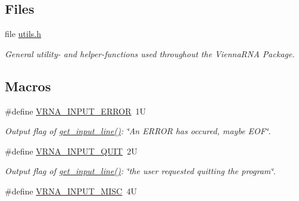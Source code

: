 \subsection*{Files}
\begin{DoxyCompactItemize}
\item 
file \hyperlink{utils_8h}{utils.\-h}
\begin{DoxyCompactList}\small\item\em General utility-\/ and helper-\/functions used throughout the {\itshape Vienna\-R\-N\-A} {\itshape Package}. \end{DoxyCompactList}\end{DoxyCompactItemize}
\subsection*{Macros}
\begin{DoxyCompactItemize}
\item 
\hypertarget{group__utils_gad403c9ea58f1836689404c2931419c8c}{\#define \hyperlink{group__utils_gad403c9ea58f1836689404c2931419c8c}{V\-R\-N\-A\-\_\-\-I\-N\-P\-U\-T\-\_\-\-E\-R\-R\-O\-R}~1\-U}\label{group__utils_gad403c9ea58f1836689404c2931419c8c}

\begin{DoxyCompactList}\small\item\em Output flag of \hyperlink{group__utils_ga8ef1835eb83f542396f59f0b205965e5}{get\-\_\-input\-\_\-line()}\-: {\itshape \char`\"{}\-An E\-R\-R\-O\-R has occured, maybe E\-O\-F\char`\"{}}. \end{DoxyCompactList}\item 
\hypertarget{group__utils_ga72f3c6ca5c83d2b9baed2922d19c403d}{\#define \hyperlink{group__utils_ga72f3c6ca5c83d2b9baed2922d19c403d}{V\-R\-N\-A\-\_\-\-I\-N\-P\-U\-T\-\_\-\-Q\-U\-I\-T}~2\-U}\label{group__utils_ga72f3c6ca5c83d2b9baed2922d19c403d}

\begin{DoxyCompactList}\small\item\em Output flag of \hyperlink{group__utils_ga8ef1835eb83f542396f59f0b205965e5}{get\-\_\-input\-\_\-line()}\-: {\itshape \char`\"{}the user requested quitting the program\char`\"{}}. \end{DoxyCompactList}\item 
\hypertarget{group__utils_ga8e3241b321c9c1a78a69e59e2e019a71}{\#define \hyperlink{group__utils_ga8e3241b321c9c1a78a69e59e2e019a71}{V\-R\-N\-A\-\_\-\-I\-N\-P\-U\-T\-\_\-\-M\-I\-S\-C}~4\-U}\label{group__utils_ga8e3241b321c9c1a78a69e59e2e019a71}


\end{DoxyCompactItemize}
